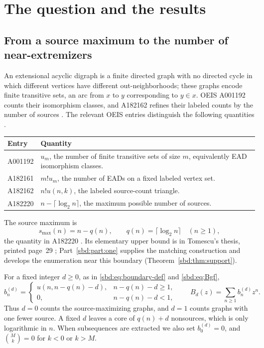 \documentclass[11pt,a4paper]{article}
\theoremstyle{definition}
\begin{document}
\section{The question and the results}
\label{sbd:xtm:sec:introduction}

\subsection{From a source maximum to the number of near-extremizers}
An extensional acyclic digraph is a finite directed graph with no directed
cycle in which different vertices have different out-neighborhoods; these
graphs encode finite transitive sets, an arc from $x$ to $y$ corresponding
to $y\in x$. OEIS A001192 counts their isomorphism classes, and A182162
refines their labeled counts by the number of sources
\cite{oeis1192,oeis162}. The relevant OEIS entries distinguish the
following quantities \cite{oeis220,oeis162,oeis1192,oeis161}.
\begin{center}
\begin{tabular}{@{}p{}p{}@{}}
\toprule
Entry & Quantity \\
\midrule
A001192 & $u_m$, the number of finite transitive sets of size $m$,
equivalently EAD isomorphism classes.\\
A182161 & $m!u_m$, the number of EADs on a fixed labeled vertex set.\\
A182162 & $n!u(n,k)$, the labeled source-count triangle.\\
A182220 & $n-\lceil\log_2n\rceil$, the maximum possible number of sources.\\
\bottomrule
\end{tabular}
\end{center}
The source maximum is
\begin{equation}\label{sbd:xtm:eq:maximum}
 s_{\max}(n)=n-q(n),\qquad q(n)=\lceil\log_2 n\rceil\quad(n\ge1),
\end{equation}
the quantity in A182220 \cite{oeis220}. Its elementary upper bound is in
Tomescu's thesis, printed page~29 \cite{tomescu}; Part~\ref{sbd:part:one}
supplies the matching construction and develops the enumeration near this
boundary (Theorem~\ref{sbd:thm:support}).

For a fixed integer $d\ge0$, as in \eqref{sbd:eq:boundary-def} and
\eqref{sbd:eq:Bgf},
\begin{equation}\label{sbd:xtm:eq:defect-definition}
 b_n^{(d)}=
 \begin{cases}
 u(n,n-q(n)-d),&n-q(n)-d\ge1,\\
 0,&n-q(n)-d<1,
 \end{cases}
 \qquad
 B_d(z)=\sum_{n\ge1}b_n^{(d)}z^n.
\end{equation}
Thus $d=0$ counts the source-maximizing graphs, and $d=1$ counts graphs
with one fewer source. A fixed $d$ leaves a core of $q(n)+d$ nonsources,
which is only logarithmic in $n$. When subsequences are extracted we also
set $b_0^{(d)}=0$, and $\binom Mk=0$ for $k<0$ or $k>M$.
\end{document}
